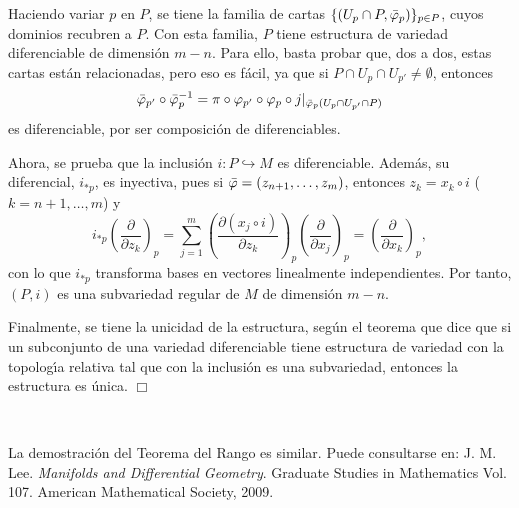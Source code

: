 \documentclass[cursovd_portada.tex]{subfiles}
\begin{document}
Haciendo variar $p$ en $P$, se tiene la familia de cartas $\{(U_p\cap P,\bar{\varphi}_p)\}_{p\in P}$, cuyos dominios
recubren a $P$. Con esta familia, $P$ tiene estructura de variedad diferenciable de dimensi\'{o}n $m-n$. Para ello,
basta probar que, dos a dos, estas cartas est\'{a}n relacionadas, pero eso es f\'{a}cil, ya que si $P\cap U_p\cap
U_{p'}\neq \emptyset$, entonces
$$\bar{\varphi}_{p'}\circ{\bar{\varphi}_p}^{-1}=\pi\circ\varphi_{p'}\circ\varphi_p\circ j|_
{\bar{\varphi}_p(U_p\cap U_{p'}\cap P)}$$ es diferenciable, por ser composici\'{o}n de diferenciables.
\par
Ahora, se prueba que la inclusi\'{o}n $i:P\hookrightarrow M$ es diferenciable. Adem\'{a}s, su diferencial, $i_{*p}$, es
inyectiva, pues si $\bar{\varphi}=(z_{n+1}, \dots ,z_m)$, entonces $z_k=x_k\circ i$ ($k=n+1,\dots ,m$) y
$$i_{*p}\left(\frac{\partial}{\partial z_k}\right)_p=\sum_{j=1}^m\left(\frac{\partial
(x_j\circ i)}{\partial z_k}\right)_p\left(\frac{\partial}{\partial x_j}\right)_p=\left(\frac{
\partial}{\partial x_k}\right)_p,$$
con lo que $i_{*p}$ transforma bases en vectores linealmente independientes. Por tanto, $(P,i)$ es una subvariedad
regular de $M$ de dimensi\'{o}n $m-n$.
\par
Finalmente, se tiene la unicidad de la estructura, seg\'{u}n el teorema que dice que si un subconjunto de una variedad
diferenciable tiene estructura de variedad con la topolog\'{\i}a relativa tal que con la inclusi\'{o}n es una subvariedad,
entonces la estructura es \'{u}nica. \hfill $\Box$

\

La demostraci\'on del Teorema del Rango es similar. Puede
consultarse en: J. M. Lee. {\it Manifolds and Differential
Geometry}. Graduate Studies in Mathematics Vol. 107. American
Mathematical Society, 2009.
\end{document}
